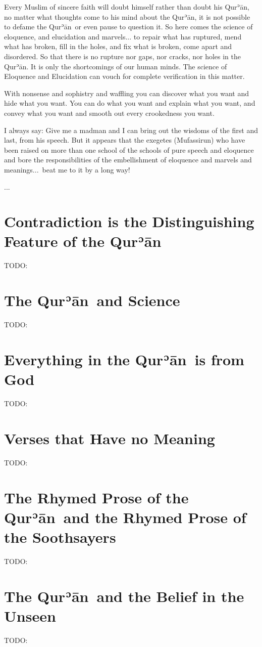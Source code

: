 \documentclass[12pt]{memoir}
\def\´{ʾ} %
\def \Quran{Qur\-\´ān} %
\begin{document}
Every Muslim of sincere faith will doubt himself rather than doubt his \Quran,
no matter what thoughts come to his mind about the \Quran,
it is not possible to defame the \Quran\ or even pause to question it.
So here comes the science of eloquence, and elucidation and marvels...
to repair what has ruptured, mend what has broken, fill in the holes,
and fix what is broken, come apart and disordered.
So that there is no rupture nor gaps, nor cracks, nor holes in the \Quran.
It is only the shortcomings of our human minds.
The science of Eloquence and Elucidation can vouch
for complete verification in this matter.

With nonsense and sophistry and waffling you can discover what you want
and hide what you want. You can do what you want and explain what you want,
and convey what you want and smooth out every crookedness you want.

I always say: Give me a madman and I can bring out the wisdoms of the first
and last, from his speech.
But it appears that the exegetes (Mufassirun) who have been raised
on more than one school of the schools of pure speech and eloquence
and bore the responsibilities of the embellishment of eloquence
and marvels and meanings...\ beat me to it by a long way!

...

\section{Contradiction is the Distinguishing Feature of the \Quran}
TODO:
\section{The \Quran\ and Science}
TODO:
\section{Everything in the \Quran\ is from God}
TODO:
\section{Verses that Have no Meaning}
TODO:
\section{The Rhymed Prose of the \Quran\ and
the Rhymed Prose of the Soothsayers}
TODO:
\section{The \Quran\ and the Belief in the Unseen}
TODO:
\end{document}
